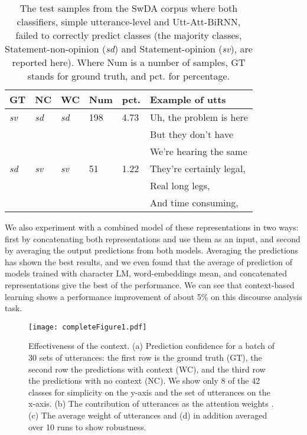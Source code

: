 \documentclass[a4paper]{article}
\begin{document}
\begin{table}[b]
\centering
\caption{The test samples from the SwDA corpus where both classifiers, simple utterance-level and Utt-Att-BiRNN, failed to correctly predict classes (the majority classes, Statement-non-opinion (\textit{sd}) and Statement-opinion (\textit{sv}), are reported here). Where Num is a number of samples, GT stands for ground truth, and pct. for percentage.}
\label{tab:faliurepredictions}
\begin{tabular}{llllll}
\toprule
\textbf{GT} & \textbf{NC}  &  \textbf{WC} & \textbf{Num} & \textbf{pct.} & \textbf{Example of utts} \\
\midrule
\textit{sv}   &  \textit{sd}   &  \textit{sd}   & 198   &  4.73  & Uh, the problem is here \\
     &       &       &       &        & But they don't have \\
\vspace{0.3cm}
     &       &       &       &        & We're hearing the same \\
\textit{sd}   &  \textit{sv}   &  \textit{sv}   & 51    &  1.22  & They're certainly legal, \\
     &       &       &       &        & Real long legs, \\
     &       &       &       &        & And time consuming, \\

\bottomrule
\end{tabular}
\end{table}

We also experiment with a combined model of these representations in two ways: first by concatenating both representations and use them as an input, and second by averaging the output predictions from both models. 
Averaging the predictions has shown the best results, and we even found that the average of prediction of models trained with character LM, word-embeddings mean, and concatenated representations give the best of the performance.  
We can see that context-based learning shows a performance improvement of about 5\% on this discourse analysis task.



\begin{figure*}[t]
  \centering
  \texttt{[image: completeFigure1.pdf]}
  \caption{Effectiveness of the context. 
  (a) Prediction confidence for a batch of 30 sets of utterances: the first row is the ground truth (GT), the second row the predictions with context (WC), and the third row the predictions with no context (NC). 
  We show only 8 of the 42 classes for simplicity on the y-axis and the set of utterances on the x-axis. 
  (b) The contribution of utterances  as the attention weights . 
  (c) The average weight of utterances and 
  (d) in addition averaged over 10 runs to show robustness.} 
  \label{fig:completeFigure}
\end{figure*}
\end{document}
